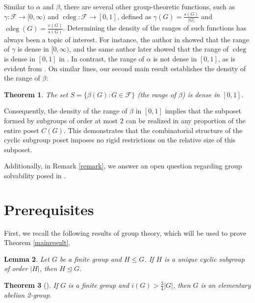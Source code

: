 \documentclass[a4paper,11pt]{amsart}
\numberwithin{equation}{section}
\numberwithin{equation}{subsection}
\newtheorem{theorem}{Theorem}[section]
\newtheorem{lemma}[theorem]{Lemma}
\begin{document}
Similar to $\alpha$ and $\beta$, there are several other group-theoretic functions, such as $\gamma:\mathcal{F}\to [0,\infty)$ and $\operatorname{cdeg}: \mathcal{F}\to [0,1]$, defined as  $\gamma(G)=\frac{s(G)}{|G|}$ and $\operatorname{cdeg}(G)=\frac{c(G)}{s(G)}$. Determining the density of the ranges of such functions has always been a topic of interest. For instance, the author in \cite[Theorem 4.3]{SML} showed that the range of $\gamma$ is dense in  $[0,\infty)$, and the same author later showed that the range of $\operatorname{cdeg}$ is dense in $[0,1]$ in \cite[Theorem 3.2]{RS}. In contrast, the range of $\alpha$ is not dense in $[0,1]$, as is evident from \cite[Theorem 5]{GL}. On similar lines, our second main result establishes the density of the range of $\beta$:




\begin{theorem}\label{mainresult2}
    The set $S=\{\beta(G): G\in \mathcal{F} \}$ (the range of $\beta$) is dense in $[0,1]$.
\end{theorem}

Consequently, the density of the range of $\beta$ in $[0, 1]$ implies that the subposet formed by subgroups of order at most $2$ can be realized in any proportion of the entire poset $C(G)$. This demonstrates that the combinatorial structure of the cyclic subgroup poset imposes no rigid restrictions on the relative size of this subposet.



Additionally, in Remark \ref{remark}, we answer an open question regarding group solvability posed in \cite{GS}.

\section{Prerequisites}

 First, we recall the following results of group theory, which will be used to prove Theorem \ref{mainresult}.
\begin{lemma}\label{normal}
    Let $G$ be a finite group and $H\leq G$. If $H$ is a unique cyclic subgroup of order $|H|$, then $H\trianglelefteq G$. 
\end{lemma}





\begin{theorem}[]\label{3/4 inv}
 If $G$ is a finite group and $i(G)> \frac{3}{4}|G|$, then $G$ is an elementary
 abelian 2-group.
\end{theorem}
\end{document}
